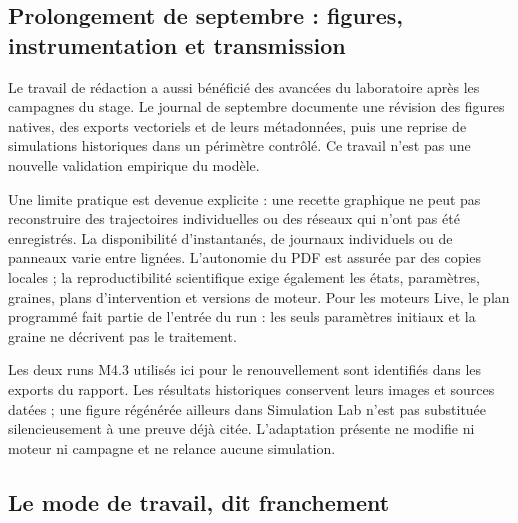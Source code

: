 \documentclass[11pt,a4paper]{article}
\begin{document}
\subsection{Prolongement de septembre : figures, instrumentation et transmission}
Le travail de rédaction a aussi bénéficié des avancées du laboratoire après
les campagnes du stage. Le journal de septembre documente une révision des
figures natives, des exports vectoriels et de leurs métadonnées, puis une
reprise de simulations historiques dans un périmètre contrôlé. Ce travail
n'est pas une nouvelle validation empirique du modèle.

Une limite pratique est devenue explicite : une recette graphique ne peut
pas reconstruire des trajectoires individuelles ou des réseaux qui n'ont
pas été enregistrés. La disponibilité d'instantanés, de journaux individuels
ou de panneaux varie entre lignées. L'autonomie du PDF est assurée par des
copies locales ; la reproductibilité scientifique exige également les états,
paramètres, graines, plans d'intervention et versions de moteur.
Pour les moteurs Live, le plan programmé fait partie de l'entrée du run :
les seuls paramètres initiaux et la graine ne décrivent pas le traitement.

Les deux runs M4.3 utilisés ici pour le renouvellement sont identifiés dans
les exports du rapport. Les résultats historiques conservent leurs images
et sources datées ; une figure régénérée ailleurs dans Simulation Lab n'est
pas substituée silencieusement à une preuve déjà citée. L'adaptation présente
ne modifie ni moteur ni campagne et ne relance aucune simulation.

\subsection{Le mode de travail, dit franchement}
\end{document}
